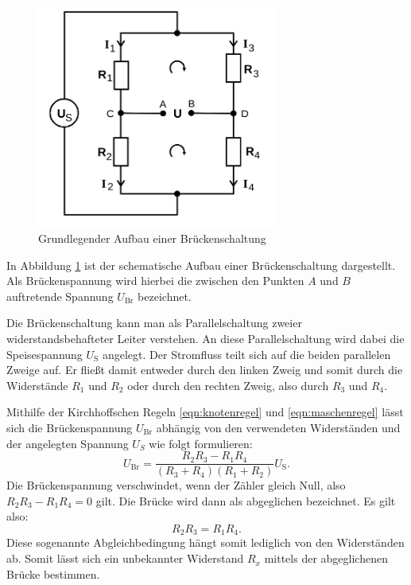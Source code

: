 \begin{figure}
  \centering
  \includegraphics[width=0.7\textwidth]{Bilder/brueckenschaltungallgemein.png}
  \caption{Grundlegender Aufbau einer Brückenschaltung \cite{Anleitung}}
  \label{fig:brückenschaltung}
\end{figure}
In Abbildung \ref{fig:brückenschaltung} ist der schematische Aufbau einer Brückenschaltung dargestellt.
Als Brückenspannung wird hierbei die zwischen den Punkten $A$ und $B$ auftretende Spannung $U_{\text{Br}}$ bezeichnet.

Die Brückenschaltung kann man als Parallelschaltung zweier widerstandsbehafteter Leiter verstehen. An diese Parallelschaltung wird dabei die Speisespannung $U_{\text{S}}$ angelegt.
Der Stromfluss teilt sich auf die beiden parallelen Zweige auf. Er fließt damit entweder durch den linken Zweig und somit durch die Widerstände $R_1$ und $R_2$ oder durch den rechten Zweig, also durch $R_3$ und $R_4$.

Mithilfe der Kirchhoffschen Regeln \eqref{eqn:knotenregel} und \eqref{eqn:maschenregel} lässt sich die Brückenspannung $U_{\text{Br}}$ abhängig von den verwendeten Widerständen und der angelegten Spannung $U_S$ wie folgt formulieren:
\begin{equation}
  \label{eqn:brückeeingang}
U_{\text{Br}}=\frac{R_2R_3-R_1R_4}{(R_3+R_4)(R_1+R_2)}U_{\text{S}} \text{.}
\end{equation}
Die Brückenspannung verschwindet, wenn der Zähler gleich Null, also $R_2R_3-R_1R_4=0$ gilt.
Die Brücke wird dann als abgeglichen bezeichnet. Es gilt also:
\begin{equation}
R_2R_3=R_1R_4 \text{.}
\label{eqn:abgleichbedingung}
\end{equation}
Diese sogenannte Abgleichbedingung hängt somit lediglich von den Widerständen ab. Somit lässt sich ein unbekannter Widerstand $R_x$ mittels der abgeglichenen Brücke bestimmen.

